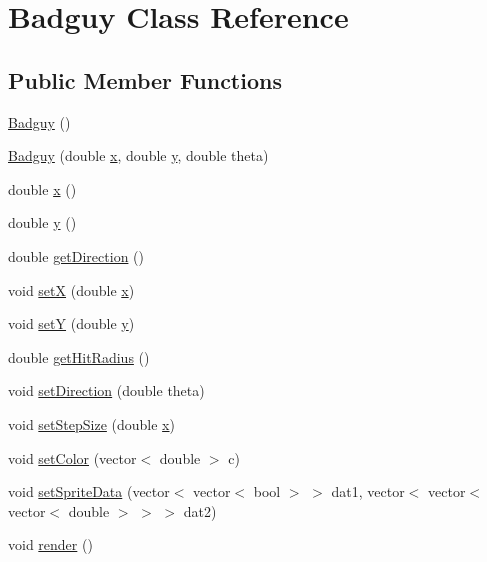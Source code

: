 \hypertarget{classBadguy}{\section{Badguy Class Reference}
\label{classBadguy}
}
\subsection*{Public Member Functions}
\begin{DoxyCompactItemize}
\item 
\hyperlink{classBadguy_a5aeb8242245e226fd9ce7fb3d9f3caf4}{Badguy} ()
\item 
\hyperlink{classBadguy_a90c8f82677f3485457bb2ab5f53f2193}{Badguy} (double \hyperlink{classBadguy_ab68f48d60da3630aeb3b0a8e6080acce}{x}, double \hyperlink{classBadguy_a59cb0a80da16789d9b89b1a94230c2a5}{y}, double theta)
\item 
double \hyperlink{classBadguy_ab68f48d60da3630aeb3b0a8e6080acce}{x} ()
\item 
double \hyperlink{classBadguy_a59cb0a80da16789d9b89b1a94230c2a5}{y} ()
\item 
double \hyperlink{classBadguy_a846380bfe1c2b6528ae6e89491221671}{get\-Direction} ()
\item 
void \hyperlink{classBadguy_ad3d863742530fde5f17fd1b780954ff1}{set\-X} (double \hyperlink{classBadguy_ab68f48d60da3630aeb3b0a8e6080acce}{x})
\item 
void \hyperlink{classBadguy_aedf01c1f221dbff7b96e11ee16eabfa7}{set\-Y} (double \hyperlink{classBadguy_a59cb0a80da16789d9b89b1a94230c2a5}{y})
\item 
double \hyperlink{classBadguy_a313dc415515619098696131a95e4ed1d}{get\-Hit\-Radius} ()
\item 
void \hyperlink{classBadguy_a51f9fae76876a18c1904a757639d9837}{set\-Direction} (double theta)
\item 
void \hyperlink{classBadguy_a93937e2b70f6fd6ed6405dbbc97d4105}{set\-Step\-Size} (double \hyperlink{classBadguy_ab68f48d60da3630aeb3b0a8e6080acce}{x})
\item 
void \hyperlink{classBadguy_a27efb0318dfd8c5a5f486142e6ade4dc}{set\-Color} (vector$<$ double $>$ c)
\item 
void \hyperlink{classBadguy_a25a22bf95f477efa88dd2cb5f2743897}{set\-Sprite\-Data} (vector$<$ vector$<$ bool $>$ $>$ dat1, vector$<$ vector$<$ vector$<$ double $>$ $>$ $>$ dat2)
\item 
void \hyperlink{classBadguy_a4b2e8038d368688ce8a389fbd6b00790}{render} ()

\end{DoxyCompactItemize}
